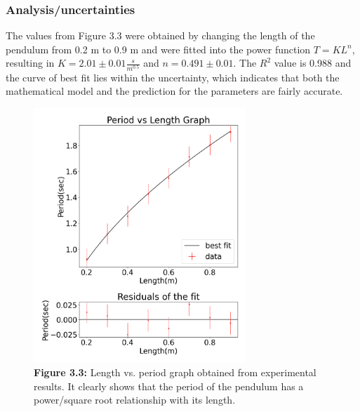 \documentclass[11pt,titlepage,a4paper,twocolumn]{article}
\begin{document}
        \subsubsection{Analysis/uncertainties}
            \hspace{\parindent}\hspace{\parindent}The values from Figure 3.3 were obtained by changing the length of the pendulum from 0.2 m to 0.9 m and were fitted into the power function $T = KL^n$, resulting in $K = 2.01 \pm 0.01\frac{s}{m^{0.5}}$ and $n = 0.491 \pm 0.01$. The $R^2$ value is 0.988 and the curve of best fit lies within the uncertainty, which indicates that both the mathematical model and the prediction for the parameters are fairly accurate. 
            \begin{figure}[H]
                \centering
                \includegraphics[width=8cm]{3.3.1.png}
                \caption*{\textbf{Figure 3.3:} Length vs. period graph obtained from experimental results. It clearly shows that the period of the pendulum has a power/square root relationship with its length.}
            \end{figure}
    
\end{document}
